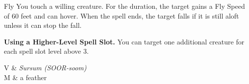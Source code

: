 \begin{Spell}[
  tags=Concentration,
  level={3rd},
  time={1 Action},
  range={Touch},
  components={V, S, M},
  duration={10 minutes},
  school={Transmutation},
  attack={None},
  effect={Movement}
]{Fly}
You touch a willing creature. For the duration, the target gains a Fly Speed of 60 feet and can hover. When the spell ends, the target falls if it is still aloft unless it can stop the fall.

\textbf{Using a Higher-Level Spell Slot.} You can target one additional creature for each spell slot level above 3.

\begin{components}
V & \textit{Sursum (SOOR-soom)} \\
M & a feather
\end{components}
\end{Spell}

